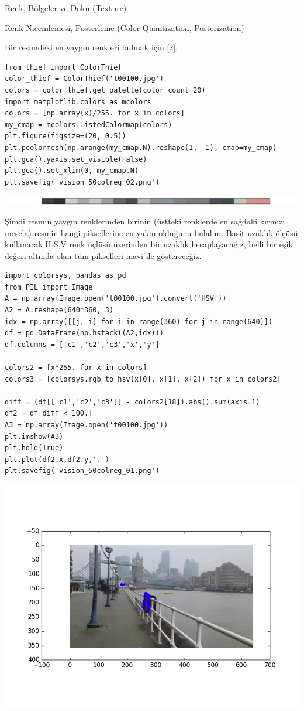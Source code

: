 \documentclass[12pt,fleqn]{article}\usepackage{../../common}
\begin{document}
Renk, Bölgeler ve Doku (Texture)

Renk Nicemlemesi, Posterleme (Color Quantization, Posterization)

Bir resimdeki en yaygın renkleri bulmak için [2],

\begin{verbatim}
from thief import ColorThief
color_thief = ColorThief('t00100.jpg')
colors = color_thief.get_palette(color_count=20)  
import matplotlib.colors as mcolors
colors = [np.array(x)/255. for x in colors]
my_cmap = mcolors.ListedColormap(colors)
plt.figure(figsize=(20, 0.5))
plt.pcolormesh(np.arange(my_cmap.N).reshape(1, -1), cmap=my_cmap)
plt.gca().yaxis.set_visible(False)
plt.gca().set_xlim(0, my_cmap.N)
plt.savefig('vision_50colreg_02.png')
\end{verbatim}

\includegraphics[width=15cm]{vision_50colreg_02.png}

Şimdi resmin yaygın renklerinden birinin (üstteki renklerde en sağdaki kırmızı
mesela) resmin hangi piksellerine en yakın olduğunu bulalım. Basit uzaklık
ölçüsü kullanarak H,S,V renk üçlüsü üzerinden bir uzaklık hesaplayacağız, belli
bir eşik değeri altında olan tüm pikselleri mavi ile göstereceğiz.

\begin{verbatim}
import colorsys, pandas as pd
from PIL import Image
A = np.array(Image.open('t00100.jpg').convert('HSV'))
A2 = A.reshape(640*360, 3)
idx = np.array([[j, i] for i in range(360) for j in range(640)])
df = pd.DataFrame(np.hstack((A2,idx)))
df.columns = ['c1','c2','c3','x','y']

colors2 = [x*255. for x in colors]
colors3 = [colorsys.rgb_to_hsv(x[0], x[1], x[2]) for x in colors2]

diff = (df[['c1','c2','c3']] - colors2[18]).abs().sum(axis=1)
df2 = df[diff < 100.]
A3 = np.array(Image.open('t00100.jpg'))
plt.imshow(A3)
plt.hold(True)
plt.plot(df2.x,df2.y,'.')
plt.savefig('vision_50colreg_01.png')
\end{verbatim}

\includegraphics[width=15cm]{vision_50colreg_01.png}
\end{document}
